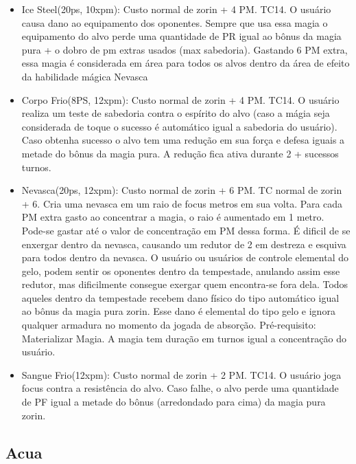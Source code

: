 \begin{itemize}
\item Ice Steel(20ps, 10xpm): Custo normal de zorin + 4 PM. TC14.\newline
O usuário causa dano ao equipamento dos oponentes. Sempre que usa essa magia o equipamento do alvo perde uma quantidade de PR igual ao bônus da magia pura + o dobro de pm extras usados (max sabedoria). Gastando 6 PM extra, essa magia é considerada em área para todos os alvos dentro da área de efeito da habilidade mágica Nevasca

	\item Corpo Frio(8PS, 12xpm): Custo normal de zorin + 4 PM. TC14.\newline
O usuário realiza um teste de sabedoria contra o espírito do alvo (caso a mágia seja considerada de toque o sucesso é automático igual a sabedoria do usuário). Caso obtenha sucesso o alvo tem uma redução em sua força e defesa iguais a metade do bônus da magia pura. A redução fica ativa durante 2 + sucessos turnos.

	\item Nevasca(20ps, 12xpm): Custo normal de zorin + 6 PM. TC normal de zorin + 6.\newline
Cria uma nevasca em um raio de focus metros em sua volta. Para cada PM extra gasto ao concentrar a magia, o raio é aumentado em 1 metro. Pode-se gastar até o valor de concentração em PM dessa forma. É dificil de se enxergar dentro da nevasca, causando um redutor de 2 em destreza e esquiva para todos dentro da nevasca. O usuário ou usuários de controle elemental do gelo, podem sentir os oponentes dentro da tempestade, anulando assim esse redutor, mas dificilmente consegue exergar quem encontra-se fora dela. Todos aqueles dentro da tempestade recebem dano físico do tipo automático igual ao bônus da magia pura zorin. Esse dano é elemental do tipo gelo e ignora qualquer armadura no momento da jogada de absorção. Pré-requisito: Materializar Magia. A magia tem duração em turnos igual a concentração do usuário.

	\item Sangue Frio(12xpm): Custo normal de zorin + 2 PM. TC14.\newline 
O usuário joga focus contra a resistência do alvo. Caso falhe, o alvo perde uma quantidade de PF igual a metade do bônus (arredondado para cima) da magia pura zorin.

\end{itemize}



\subsection{Acua}

